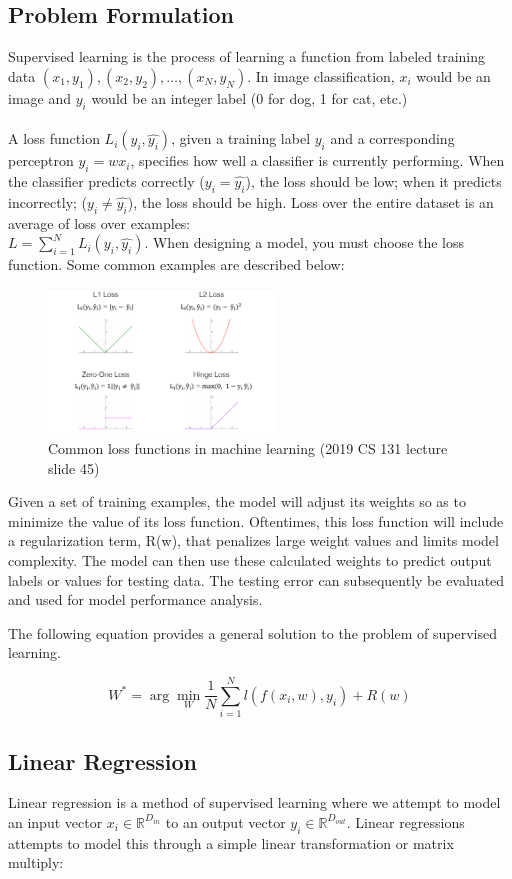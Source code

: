 ﻿\documentclass{article}
\begin{document}
\subsection{Problem Formulation}
Supervised learning is the process of learning a function from labeled training data $(x_1, y_1), (x_2, y_2), \ldots, (x_N, y_N)$.
In image classification, $x_i$ would be an image and $y_i$ would be an integer label (0 for dog, 1 for cat, etc.)\\
\\
A loss function $L_i(y_i, \hat{y_i})$, given a training label $y_i$ and a corresponding perceptron $\hat{y_i} = wx_i$, specifies how well a classifier is currently performing. When the classifier predicts correctly ($y_i = \hat{y_i}$), the loss should be low; when it predicts incorrectly; ($y_i \neq \hat{y_i}$), the loss should be high.
Loss over the entire dataset is an average of loss over examples:\\
$L = \sum_{i=1}^N L_i(y_i, \hat{y_i})$. When designing a model, you must choose the loss function. Some common examples are described below:
\begin{figure}[h]
\includegraphics[width=6cm]{loss_functions.PNG}
\centering
\caption{Common loss functions in machine learning (2019 CS 131 lecture slide 45)}
\end{figure}

Given a set of training examples, the model will adjust its weights so as to minimize the value of its loss function. Oftentimes, this loss function will include a regularization term, R(w), that penalizes large weight values and limits model complexity. The model can then use these calculated weights to predict output labels or values for testing data. The testing error can subsequently be evaluated and used for model performance analysis. 

The following equation provides a general solution to the problem of supervised learning. 

$$W^* = \arg\min_{W} \frac{1}{N} \sum_{i=1}^{N} l(f(x_{i},w),y_{i}) + R(w)$$

\subsection{Linear Regression}
Linear regression is a method of supervised learning where we attempt to model an input vector $x_i\in \mathbb{R}^{D_{in}}$ to an output vector $y_i\in \mathbb{R}^{D_{out}}$. Linear regressions attempts to model this through a simple linear transformation or matrix multiply:
\end{document}

